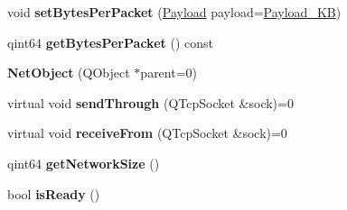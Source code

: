 \begin{DoxyCompactItemize}
\item 
\hypertarget{class_k_cloud_1_1_net_object_a742b01817e73f6e77b36feff50218d31}{void {\bfseries set\-Bytes\-Per\-Packet} (\hyperlink{class_k_cloud_1_1_net_object_a1183d14b184b27ea397cbf2857bc791b}{Payload} payload=\hyperlink{class_k_cloud_1_1_net_object_a1183d14b184b27ea397cbf2857bc791ba21a7b9c1348c682e61c286b7674bc3a8}{Payload\-\_\-K\-B})}\label{class_k_cloud_1_1_net_object_a742b01817e73f6e77b36feff50218d31}

\item 
\hypertarget{class_k_cloud_1_1_net_object_a19dc3480af96cad68f0ece7608a53061}{qint64 {\bfseries get\-Bytes\-Per\-Packet} () const }\label{class_k_cloud_1_1_net_object_a19dc3480af96cad68f0ece7608a53061}

\item 
\hypertarget{class_k_cloud_1_1_net_object_aa793065ebe235c8173e70ee041353345}{{\bfseries Net\-Object} (Q\-Object $\ast$parent=0)}\label{class_k_cloud_1_1_net_object_aa793065ebe235c8173e70ee041353345}

\item 
\hypertarget{class_k_cloud_1_1_net_object_ac17c80f3295427b9419f7d51dacf28f5}{virtual void {\bfseries send\-Through} (Q\-Tcp\-Socket \&sock)=0}\label{class_k_cloud_1_1_net_object_ac17c80f3295427b9419f7d51dacf28f5}

\item 
\hypertarget{class_k_cloud_1_1_net_object_a79e034a9f9498f6cca27da57234e4bb9}{virtual void {\bfseries receive\-From} (Q\-Tcp\-Socket \&sock)=0}\label{class_k_cloud_1_1_net_object_a79e034a9f9498f6cca27da57234e4bb9}

\item 
\hypertarget{class_k_cloud_1_1_net_object_a44835b59c4c1658e3529a8e752f3a3ca}{qint64 {\bfseries get\-Network\-Size} ()}\label{class_k_cloud_1_1_net_object_a44835b59c4c1658e3529a8e752f3a3ca}

\item 
\hypertarget{class_k_cloud_1_1_net_object_ae706fd67f0b7022f33efa9235155a77a}{bool {\bfseries is\-Ready} ()}\label{class_k_cloud_1_1_net_object_ae706fd67f0b7022f33efa9235155a77a}

\end{DoxyCompactItemize}
